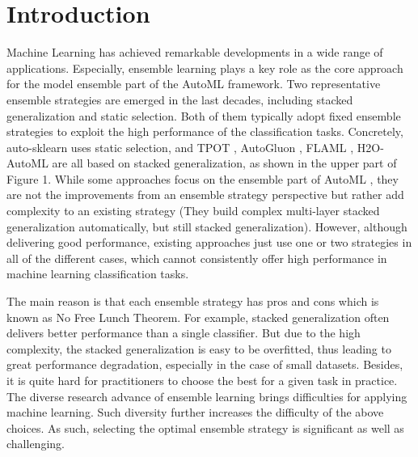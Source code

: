 \documentclass[review]{elsarticle}
\begin{document}

\section{Introduction}

Machine Learning has achieved remarkable developments in a wide range of applications. Especially, ensemble learning plays a key role as the core approach for the model ensemble part of the AutoML framework. Two representative ensemble strategies are emerged in the last decades, including stacked generalization \cite{DBLP:journals/nn/Wolpert92} and static selection. Both of them typically adopt fixed ensemble strategies to exploit the high performance of the classification tasks. Concretely, auto-sklearn uses static selection, and TPOT \cite{DBLP:books/sp/19/OlsonM19}, AutoGluon \cite{DBLP:journals/corr/abs-2003-06505}, FLAML \cite{DBLP:conf/mlsys/0001WWZ21}, H2O-AutoML \cite{ledell2020h2o} are all based on stacked generalization, as shown in the upper part of Figure 1. While some approaches focus on the ensemble part of AutoML \cite{chen2018autostacker,wistuba2017automatic}, they are not the improvements from an ensemble strategy perspective but rather add complexity to an existing strategy (They build complex multi-layer stacked generalization automatically, but still stacked generalization). However, although delivering good performance, existing approaches just use one or two strategies in all of the different cases, which cannot consistently offer high performance in machine learning classification tasks.

The main reason is that each ensemble strategy has pros and cons which is known as No Free Lunch Theorem\cite{wolpert1997no}. For example, stacked generalization often delivers better performance than a single classifier. But due to the high complexity, the stacked generalization is easy to be overfitted, thus leading to great performance degradation, especially in the case of small datasets\cite{reid2009regularized}. Besides, it is quite hard for practitioners to choose the best for a given task in practice. The diverse research advance of ensemble learning brings difficulties for applying machine learning. Such diversity further increases the difficulty of the above choices. As such, selecting the optimal ensemble strategy is significant as well as challenging.
\end{document}
